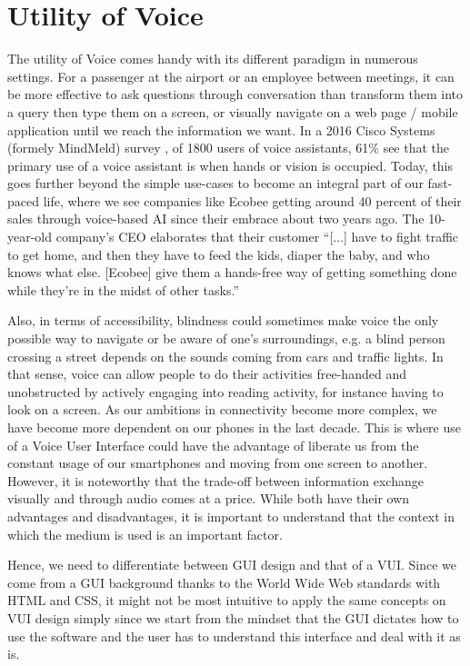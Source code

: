 \section{Utility of Voice}
The utility of Voice comes handy with its different paradigm in numerous settings. 
For a passenger at the airport or an employee between meetings, 
it can be more effective to ask questions through conversation than transform them into a query then type them on a screen,
or visually navigate on a web page / mobile application until we reach the information we want. In a 2016 Cisco Systems (formely MindMeld) survey \cite{mindmeldReport}, of 1800 users of voice assistants, 61\% see that the primary use of a voice assistant is when hands or vision is occupied.
Today, this goes further beyond the simple use-cases to become an integral part of our fast-paced life, where we see companies like Ecobee getting around 40 percent of their sales through voice-based AI \cite{mit:Alexa} since their embrace about two years ago. The 10-year-old company's CEO elaborates that their customer “[...] have to fight traffic to get home, and then they have to feed the kids, diaper the baby, and who knows what else. [Ecobee] give them a hands-free way of getting something done while they’re in the midst of other tasks.”


Also, in terms of accessibility, blindness could sometimes make voice the only possible way to navigate or be aware of one's surroundings, e.g. a blind person crossing a street depends on the sounds coming from cars and traffic lights.
In that sense, voice can allow people to do their activities free-handed and unobstructed by actively engaging into reading activity, for instance having to look on a screen.
As our ambitions in connectivity become more complex, we have become more dependent on our phones in the last decade.
This is where use of a Voice User Interface could have the advantage of liberate us from the constant usage of our smartphones and moving from one screen to another. 
However, it is noteworthy that the trade-off between information exchange visually and through audio comes at a price. While both have their own advantages and disadvantages, it is important to understand that the context in which the medium is used is an important factor.

Hence, we need to differentiate between GUI design and that of a VUI. Since  we come from a GUI background thanks to the World Wide Web standards with HTML and CSS, it might not be most intuitive to apply the same concepts on VUI design simply since we start from the mindset that the GUI dictates how to use the software and the user has to understand this interface and deal with it as is.




